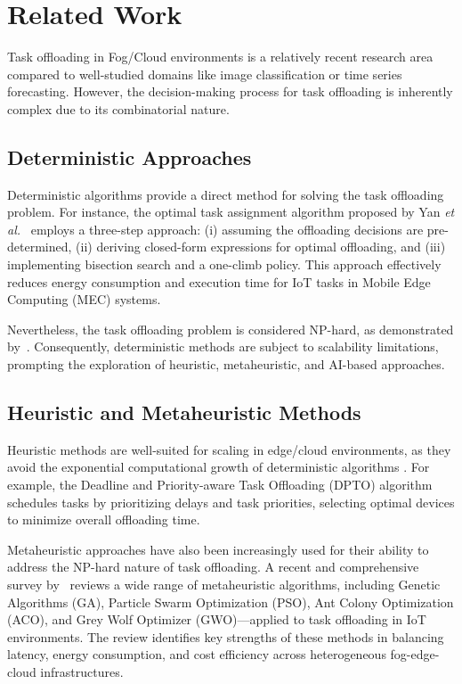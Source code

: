 \documentclass{svproc}
\begin{document}
\section{Related Work}\label{sec:related_work}


Task offloading in Fog/Cloud environments is a relatively recent research area compared to well-studied domains like image classification or time series forecasting. However, the decision-making process for task offloading is inherently complex due to its combinatorial nature.

\subsection{Deterministic Approaches}
Deterministic algorithms provide a direct method for solving the task offloading problem. For instance, the optimal task assignment algorithm proposed by Yan \textit{et al.}~\cite{yan_optimal_2020} employs a three-step approach: (i) assuming the offloading decisions are pre-determined, (ii) deriving closed-form expressions for optimal offloading, and (iii) implementing bisection search and a one-climb policy. This approach effectively reduces energy consumption and execution time for IoT tasks in Mobile Edge Computing (MEC) systems.

Nevertheless, the task offloading problem is considered NP-hard, as demonstrated by~\cite{guo_algorithmics_2024, jin_task_2024, sarkar_deep_2022}. Consequently, deterministic methods are subject to scalability limitations, prompting the exploration of heuristic, metaheuristic, and AI-based approaches.

\subsection{Heuristic and Metaheuristic Methods}

Heuristic methods are well-suited for scaling in edge/cloud environments, as they avoid the exponential computational growth of deterministic algorithms \cite{zhang_survey_2024}. For example, the Deadline and Priority-aware Task Offloading (DPTO) algorithm \cite{adhikari_dpto_2020} schedules tasks by prioritizing delays and task priorities, selecting optimal devices to minimize overall offloading time.

Metaheuristic approaches have also been increasingly used for their ability to address the NP-hard nature of task offloading. A recent and comprehensive survey by~\cite{rahmani_optimizing_2025} reviews a wide range of metaheuristic algorithms, including Genetic Algorithms (GA), Particle Swarm Optimization (PSO), Ant Colony Optimization (ACO), and Grey Wolf Optimizer (GWO)—applied to task offloading in IoT environments. The review identifies key strengths of these methods in balancing latency, energy consumption, and cost efficiency across heterogeneous fog-edge-cloud infrastructures.
\end{document}
